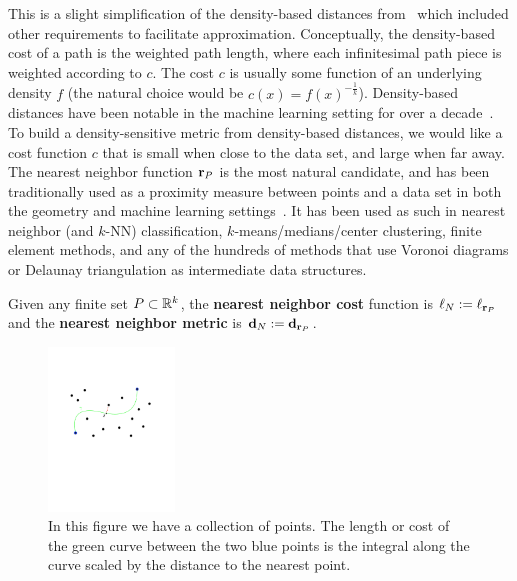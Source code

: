 This is a slight simplification of the density-based distances from~\cite{sajama05estimatingDBDM} which included other requirements to facilitate approximation.
Conceptually, the density-based cost of a path is the weighted path length, where each infinitesimal path piece is weighted according to $c$.
The cost $c$ is usually some function of an underlying density $f$ (the natural choice would be $c(x) = f(x)^{-\frac{1}{k}}$).
Density-based distances have been notable in the machine learning setting for over a decade~\cite{sajama05estimatingDBDM,bijral11semiSupLearningDBD}.
To build a density-sensitive metric from density-based distances, we would like a cost function $c$ that is small when close to the data set, and large when far away.
The nearest neighbor function $\mathbf{r}_P$ is the most natural candidate, and has been traditionally used as a proximity measure between points and a data set in both the geometry and machine learning settings~\cite{}. It has been used as such in nearest neighbor
(and $k$-NN) classification, $k$-means/medians/center clustering, finite
element methods, and any of the hundreds of methods that use Voronoi
diagrams or Delaunay triangulation as intermediate data structures.

\begin{definition} Given any finite set $P\subset \mathbb{R}^k$, the \textbf{nearest neighbor cost} function is $\ell_N := \ell_{\mathbf{r}_P}$ and the \textbf{nearest neighbor metric} is $\mathbf{d}_N := \mathbf{d}_{\mathbf{r}_P}$.
\end{definition}
\begin{figure}[htbp]
  \centering
    \includegraphics[width=0.3\textwidth]{Figures/example.pdf}
    \caption{In this figure we have a collection of points.
      The length or cost of the green curve between the two blue points
      is the integral along the curve scaled by the distance to the nearest
point.}
  \label{fig:example}
\end{figure}

